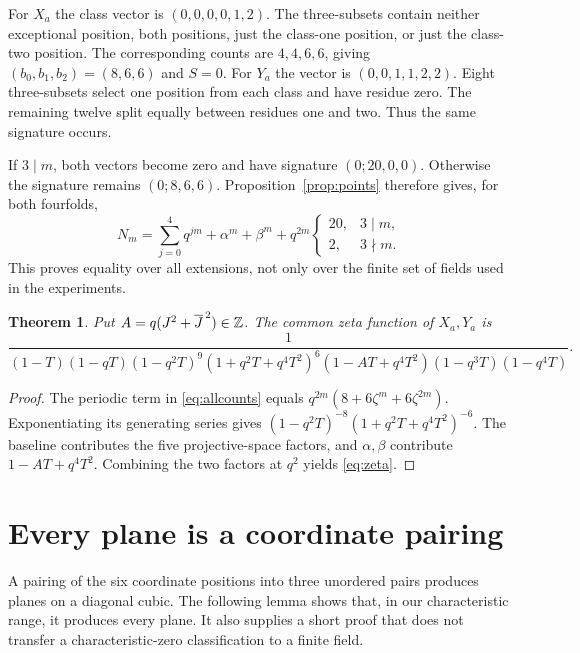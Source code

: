 \documentclass[11pt]{article}
\newtheorem{theorem}{Theorem}
\theoremstyle{remark}\newtheorem{remark}[theorem]{Remark}
\begin{document}
For $X_a$ the class vector is $(0,0,0,0,1,2)$. The three-subsets contain neither exceptional position, both positions, just the class-one position, or just the class-two position. The corresponding counts are $4,4,6,6$, giving $(b_0,b_1,b_2)=(8,6,6)$ and $S=0$.
For $Y_a$ the vector is $(0,0,1,1,2,2)$. Eight three-subsets select one position from each class and have residue zero. The remaining twelve split equally between residues one and two. Thus the same signature occurs.

If $3\mid m$, both vectors become zero and have signature $(0;20,0,0)$. Otherwise the signature remains $(0;8,6,6)$. Proposition~\ref{prop:points} therefore gives, for both fourfolds,
\begin{equation}\label{eq:allcounts}
N_m=\sum_{j=0}^4q^{jm}+\alpha^m+\beta^m+
q^{2m}\begin{cases}20,&3\mid m,\\2,&3\nmid m.\end{cases}
\end{equation}
This proves equality over all extensions, not only over the finite set of fields used in the experiments.

\begin{theorem}\label{thm:zeta}
Put $A=q(J^2+\overline J^{\,2})\in\mathbb Z$. The common zeta function of $X_a,Y_a$ is
\begin{equation}\label{eq:zeta}
\frac{1}{(1-T)(1-qT)(1-q^2T)^9
(1+q^2T+q^4T^2)^6(1-AT+q^4T^2)(1-q^3T)(1-q^4T)}.
\end{equation}
\end{theorem}
\begin{proof}
The periodic term in \eqref{eq:allcounts} equals
$q^{2m}(8+6\zeta^m+6\zeta^{2m})$.
Exponentiating its generating series gives
$(1-q^2T)^{-8}(1+q^2T+q^4T^2)^{-6}$.
The baseline contributes the five projective-space factors, and $\alpha,\beta$ contribute $1-AT+q^4T^2$. Combining the two factors at $q^2$ yields \eqref{eq:zeta}.
\end{proof}

\section{Every plane is a coordinate pairing}\label{sec:planes}
A pairing of the six coordinate positions into three unordered pairs produces planes on a diagonal cubic. The following lemma shows that, in our characteristic range, it produces every plane. It also supplies a short proof that does not transfer a characteristic-zero classification to a finite field.
\end{document}
